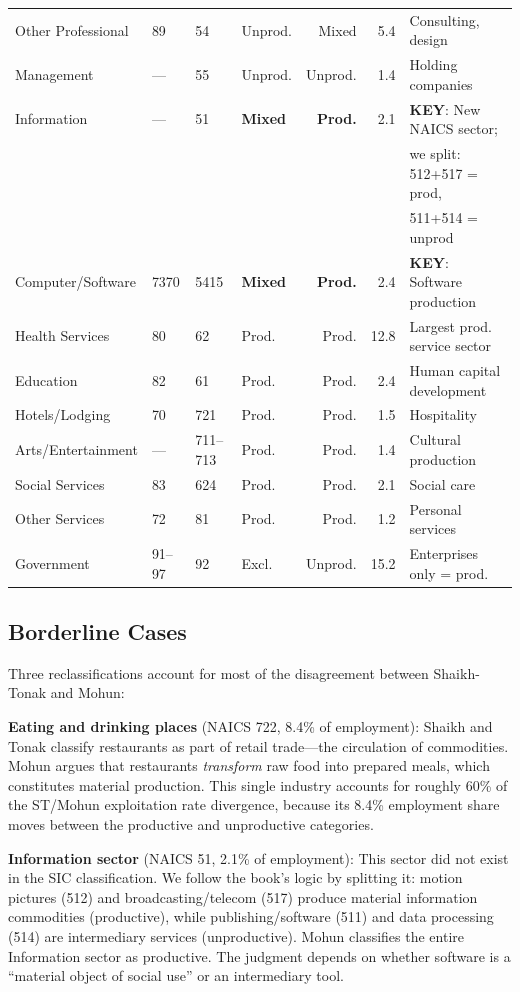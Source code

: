 \documentclass[12pt,a4paper]{article}
\begin{document}
\begin{longtable}{llllrrl}
Other Professional & 89 & 54 & Unprod. & Mixed & 5.4 & Consulting, design \\
Management & --- & 55 & Unprod. & Unprod. & 1.4 & Holding companies \\
\midrule
Information & --- & 51 & \textbf{Mixed} & \textbf{Prod.} & 2.1 & \textbf{KEY}: New NAICS sector; \\
 & & & & & & we split: 512+517 = prod, \\
 & & & & & & 511+514 = unprod \\
Computer/Software & 7370 & 5415 & \textbf{Mixed} & \textbf{Prod.} & 2.4 & \textbf{KEY}: Software production \\
\midrule
Health Services & 80 & 62 & Prod. & Prod. & 12.8 & Largest prod. service sector \\
Education & 82 & 61 & Prod. & Prod. & 2.4 & Human capital development \\
Hotels/Lodging & 70 & 721 & Prod. & Prod. & 1.5 & Hospitality \\
Arts/Entertainment & --- & 711--713 & Prod. & Prod. & 1.4 & Cultural production \\
Social Services & 83 & 624 & Prod. & Prod. & 2.1 & Social care \\
Other Services & 72 & 81 & Prod. & Prod. & 1.2 & Personal services \\
\midrule
Government & 91--97 & 92 & Excl. & Unprod. & 15.2 & Enterprises only = prod. \\
\bottomrule
\end{longtable}

\subsection{Borderline Cases}

Three reclassifications account for most of the disagreement between Shaikh-Tonak and Mohun:

\textbf{Eating and drinking places} (NAICS 722, 8.4\% of employment): Shaikh and Tonak classify restaurants as part of retail trade---the circulation of commodities. Mohun argues that restaurants \textit{transform} raw food into prepared meals, which constitutes material production. This single industry accounts for roughly 60\% of the ST/Mohun exploitation rate divergence, because its 8.4\% employment share moves between the productive and unproductive categories.

\textbf{Information sector} (NAICS 51, 2.1\% of employment): This sector did not exist in the SIC classification. We follow the book's logic by splitting it: motion pictures (512) and broadcasting/telecom (517) produce material information commodities (productive), while publishing/software (511) and data processing (514) are intermediary services (unproductive). Mohun classifies the entire Information sector as productive. The judgment depends on whether software is a ``material object of social use'' or an intermediary tool.
\end{document}
